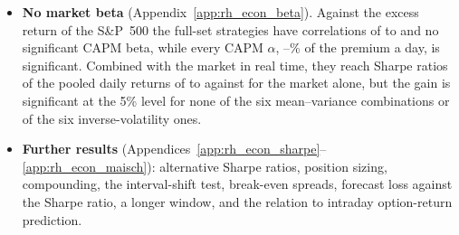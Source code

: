 \begin{itemize}
\begin{itemize}
    for \rhedDShortExBestNeg{} of the \rhedNFull).
  \end{itemize}
\item \textbf{No market beta} (Appendix~\ref{app:rh_econ_beta}). Against the excess return of the S\&P~500 the
  full-set strategies have correlations of \rhebCorrFullMin{} to \rhebCorrFullMax{} and no significant CAPM beta,
  while every CAPM $\alpha$, \rhebAlphaFullMin--\rhebAlphaFullMax\% of the premium a day, is significant. Combined with
  the market in real time, they reach Sharpe ratios of the pooled daily returns of \rhebRtMvFullMin{} to
  \rhebRtMvFullMax{} against \rhebSRmRt{} for the market alone, but the gain is significant at the 5\% level for none
  of the six mean--variance combinations or of the six inverse-volatility ones.
\item \textbf{Further results} (Appendices~\ref{app:rh_econ_sharpe}--\ref{app:rh_econ_maisch}): alternative Sharpe
  ratios, position sizing, compounding, the interval-shift test, break-even spreads, forecast loss against the Sharpe
  ratio, a longer window, and the relation to intraday option-return prediction.
\end{itemize}

